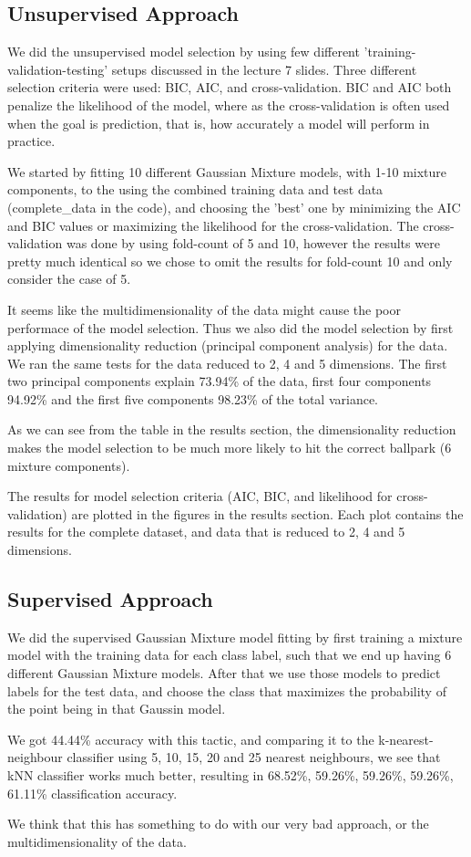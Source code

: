 \subsection{Unsupervised Approach}
We did the unsupervised model selection by using few different 'training-validation-testing' setups discussed in the lecture 7 slides. Three different selection criteria were used: BIC, AIC, and cross-validation. BIC and AIC both penalize the likelihood of the model, where as the cross-validation is often used when the goal is prediction, that is, how accurately a model will perform in practice.

We started by fitting 10 different Gaussian Mixture models, with 1-10 mixture components, to the using the combined training data and test data (complete\_data in the code), and choosing the 'best' one by minimizing the AIC and BIC values or maximizing the likelihood for the cross-validation. The cross-validation was done by using fold-count of 5 and 10, however the results were pretty much identical so we chose to omit the results for fold-count 10 and only consider the case of 5.

It seems like the multidimensionality of the data might cause the poor performace of the model selection. Thus we also did the model selection by first applying dimensionality reduction (principal component analysis) for the data. We ran the same tests for the data reduced to 2, 4 and 5 dimensions. The first two principal components explain 73.94\% of the data, first four components 94.92\% and the first five components 98.23\% of the total variance.

As we can see from the table in the results section, the dimensionality reduction makes the model selection to be much more likely to hit the correct ballpark (6 mixture components).

The results for model selection criteria (AIC, BIC, and likelihood for cross-validation) are plotted in the figures in the results section. Each plot contains the results for the complete dataset, and data that is reduced to 2, 4 and 5 dimensions.

\subsection{Supervised Approach}
We did the supervised Gaussian Mixture model fitting by first training a mixture model with the training data for each class label, such that we end up having 6 different Gaussian Mixture models. After that we use those models to predict labels for the test data, and choose the class that maximizes the probability of the point being in that Gaussin model.

We got 44.44\% accuracy with this tactic, and comparing it to the k-nearest-neighbour classifier using 5, 10, 15, 20 and 25 nearest neighbours, we see that kNN classifier works much better, resulting in 68.52\%, 59.26\%, 59.26\%, 59.26\%, 61.11\% classification accuracy.

We think that this has something to do with our very bad approach, or the multidimensionality of the data.


